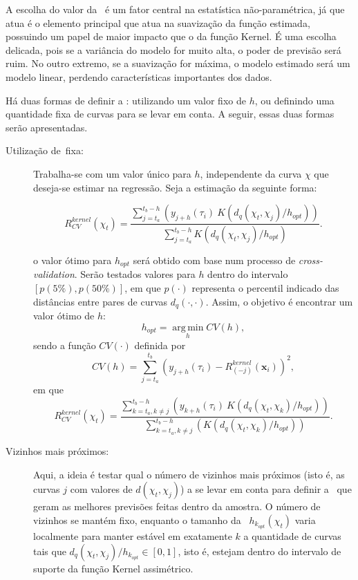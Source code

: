 \documentclass[
	12pt,				%
	openright,			%
	oneside,			%
	a4paper,			%
	english,			%
	brazil				%
	]{dissertacao-ufrgs-abntex2}
\begin{document}
A escolha do valor da \bw~é um fator central na estatística não-paramétrica, já que atua é o elemento principal que atua na suavização da função estimada, possuindo um papel de maior impacto que o da função Kernel. É uma escolha delicada, pois se a variância do modelo for muito alta, o poder de previsão será ruim. No outro extremo, se a suavização for máxima, o modelo estimado será um modelo linear, perdendo características importantes dos dados.

Há duas formas de definir a \bw: utilizando um valor fixo de $h$, ou definindo uma quantidade fixa de curvas para se levar em conta. A seguir, essas duas formas serão apresentadas.

\begin{description}

\item[Utilização de \bw \,fixa:]

Trabalha-se com um valor único para $h$, independente da curva $\chi$ que deseja-se estimar na regressão. Seja a estimação da seguinte forma:

\begin{equation}
R_{CV}^{kernel}(\chi_t) = 
\frac
	{\sum \limits_{j=t_a}^{t_b-h} \left( y_{j+h}(\tau_i)~ K(d_{q}(\chi_t,\chi_j)/h_{opt}) \right) }
	{\sum \limits_{j=t_a}^{t_b-h} K(d_{q}(\chi_t,\chi_j)/h_{opt}) }.
\end{equation}


o valor ótimo para $h_{opt}$ será obtido com base num processo de \emph{cross-validation}. Serão testados valores para $h$ dentro do intervalo $[p(5\%),p(50\%)]$, em que $p(\cdot)$ representa o percentil indicado das distâncias entre pares de curvas $d_q(\cdot,\cdot)$. Assim, o objetivo é encontrar um valor ótimo de $h$:
\[h_{opt} = \operatorname*{arg\,min}_h CV(h),\]
sendo a função $CV(\cdot)$ definida por
\[
CV(h) = \sum \limits_{j=t_a}^{t_b} \left(  y_{j+h}(\tau_i) - R_{(-j)}^{kernel}(\boldsymbol{x}_i)  \right)^2, 
\]
em que
\[
R_{CV}^{kernel}(\chi_t) = 
\frac
	{\sum \limits_{k=t_a, k \neq j}^{t_b-h} \left( y_{k+h}(\tau_i)~ K(d_{q}(\chi_t,\chi_k)/h_{opt}) \right) }
	{\sum \limits_{k=t_a, k \neq j}^{t_b-h} \left( K(d_{q}(\chi_t,\chi_k)/h_{opt}) \right)  }.
\]



\item[Vizinhos mais próximos:]

Aqui, a ideia é testar qual o número de vizinhos mais próximos (isto é, as curvas $j$ com valores de $d(\chi_t,\chi_j)$) a se levar em conta para definir a \bw~que geram as melhores previsões feitas dentro da amostra.
O número de vizinhos se mantém fixo, enquanto o tamanho da \bw~$h_{k_{opt}}(\chi_t)$ varia localmente para manter estável em exatamente $k$ a quantidade de curvas tais que $d_{q}(\chi_t,\chi_{j})/h_{k_{opt}} \in [0,1]$, isto é, estejam dentro do intervalo de suporte da função Kernel assimétrico.


\end{description}
\end{document}
